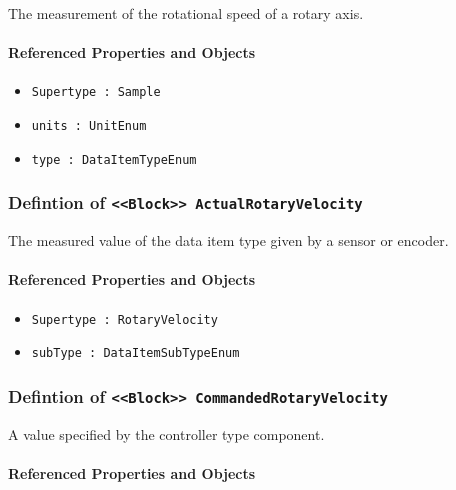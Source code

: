 The measurement of the rotational speed of a rotary axis.

\FloatBarrier
\paragraph{Referenced Properties and Objects}

\begin{itemize}
\item \texttt{Supertype : Sample}

\item \texttt{units : UnitEnum}

\item \texttt{type : DataItemTypeEnum}

\end{itemize}
\FloatBarrier
\subsubsection{Defintion of \texttt{<<Block>> ActualRotaryVelocity}}
  \label{type:ActualRotaryVelocity}

\FloatBarrier

The measured value of the data item type given by a sensor or encoder.

\FloatBarrier
\paragraph{Referenced Properties and Objects}

\begin{itemize}
\item \texttt{Supertype : RotaryVelocity}

\item \texttt{subType : DataItemSubTypeEnum}

\end{itemize}
\FloatBarrier
\subsubsection{Defintion of \texttt{<<Block>> CommandedRotaryVelocity}}
  \label{type:CommandedRotaryVelocity}

\FloatBarrier

A value specified by the controller type component.

\FloatBarrier
\paragraph{Referenced Properties and Objects}

